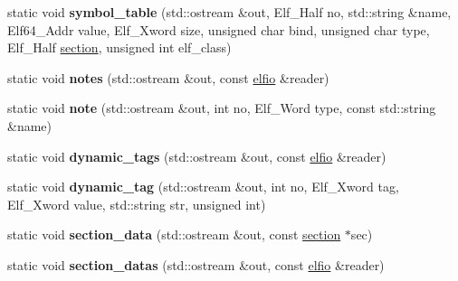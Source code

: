 \begin{DoxyCompactItemize}
\item 
static void {\bfseries symbol\+\_\+table} (std\+::ostream \&out, Elf\+\_\+\+Half no, std\+::string \&name, Elf64\+\_\+\+Addr value, Elf\+\_\+\+Xword size, unsigned char bind, unsigned char type, Elf\+\_\+\+Half \hyperlink{class_e_l_f_i_o_1_1section}{section}, unsigned int elf\+\_\+class)\hypertarget{class_e_l_f_i_o_1_1dump_a8bc5912b0f4138ccf89b0e46ce8781e8}{}\label{class_e_l_f_i_o_1_1dump_a8bc5912b0f4138ccf89b0e46ce8781e8}

\item 
static void {\bfseries notes} (std\+::ostream \&out, const \hyperlink{class_e_l_f_i_o_1_1elfio}{elfio} \&reader)\hypertarget{class_e_l_f_i_o_1_1dump_a9f3f44fe3ed3d5d88efd6f7229baa0e0}{}\label{class_e_l_f_i_o_1_1dump_a9f3f44fe3ed3d5d88efd6f7229baa0e0}

\item 
static void {\bfseries note} (std\+::ostream \&out, int no, Elf\+\_\+\+Word type, const std\+::string \&name)\hypertarget{class_e_l_f_i_o_1_1dump_a056b95608d0bf7b982c5601713e7ad52}{}\label{class_e_l_f_i_o_1_1dump_a056b95608d0bf7b982c5601713e7ad52}

\item 
static void {\bfseries dynamic\+\_\+tags} (std\+::ostream \&out, const \hyperlink{class_e_l_f_i_o_1_1elfio}{elfio} \&reader)\hypertarget{class_e_l_f_i_o_1_1dump_a86b6fd3d926ec4ffd27e266836adf600}{}\label{class_e_l_f_i_o_1_1dump_a86b6fd3d926ec4ffd27e266836adf600}

\item 
static void {\bfseries dynamic\+\_\+tag} (std\+::ostream \&out, int no, Elf\+\_\+\+Xword tag, Elf\+\_\+\+Xword value, std\+::string str, unsigned int)\hypertarget{class_e_l_f_i_o_1_1dump_a3950958d72a3b5249d8a176e90fbfd10}{}\label{class_e_l_f_i_o_1_1dump_a3950958d72a3b5249d8a176e90fbfd10}

\item 
static void {\bfseries section\+\_\+data} (std\+::ostream \&out, const \hyperlink{class_e_l_f_i_o_1_1section}{section} $\ast$sec)\hypertarget{class_e_l_f_i_o_1_1dump_a97b27bf46ba4ac7addf47f32cc35af96}{}\label{class_e_l_f_i_o_1_1dump_a97b27bf46ba4ac7addf47f32cc35af96}

\item 
static void {\bfseries section\+\_\+datas} (std\+::ostream \&out, const \hyperlink{class_e_l_f_i_o_1_1elfio}{elfio} \&reader)\hypertarget{class_e_l_f_i_o_1_1dump_a7174e9f611a14c0b561a5c2ca7a9d340}{}\label{class_e_l_f_i_o_1_1dump_a7174e9f611a14c0b561a5c2ca7a9d340}


\end{DoxyCompactItemize}
